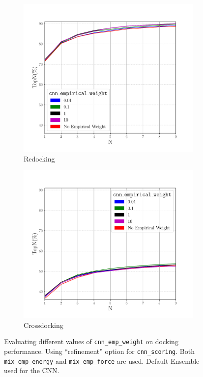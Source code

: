 \documentclass[journal=jcisd8,manuscript=article]{achemso}
\begin{document}
\begin{figure}    
        \begin{subfigure}[b]{0.48\textwidth}    
		\centering
		\includegraphics[width=\textwidth]{figures/redocking/refine_sweep_cnn_empirical_weight_line.pdf}
		\caption{Redocking}
		\label{fig:CNNEmpWeightRD}
        \end{subfigure}    
        \begin{subfigure}[b]{0.48\textwidth}    
		\centering
		\includegraphics[width=\textwidth]{figures/crossdocking/refine_sweep_cnn_empirical_weight_line.pdf}
		\caption{Crossdocking}
		\label{fig:CNNEmpWeightCD}
        \end{subfigure}    
	\caption{Evaluating different values of \texttt{cnn\_emp\_weight} on docking performance. Using ``refinement'' option for \texttt{cnn\_scoring}. Both \texttt{mix\_emp\_energy} and \texttt{mix\_emp\_force} are used. Default Ensemble used for the CNN.}
	\label{fig:CNNEmpWeight}
\end{figure} 
\end{document}
